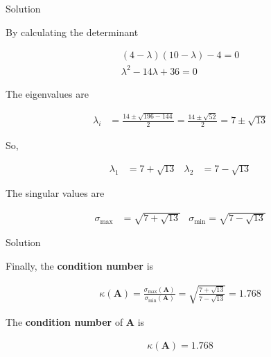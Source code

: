 \documentclass{beamer}
\numberwithin{equation}{section}
\theoremstyle{remark}
\let\vec\mathbf
\begin{document}
\begin{frame}{Solution}

By calculating the determinant 

\begin{align}
(4-\lambda)(10-\lambda)-4 = 0 \\
\lambda^2 - 14\lambda + 36 = 0
\end{align}

The eigenvalues are

\begin{align}
\lambda_i &= \frac{14 \pm \sqrt{196 - 144}}{2}
= \frac{14 \pm \sqrt{52}}{2}
= 7 \pm \sqrt{13}
\end{align}

So,

\begin{align}
\lambda_1 &= 7+\sqrt{13} & \lambda_2 &= 7-\sqrt{13}
\end{align}

The singular values are

\begin{align}
\sigma_{\max} &= \sqrt{7+\sqrt{13}} & \sigma_{\min} = \sqrt{7-\sqrt{13}}
\end{align}

\end{frame}

\begin{frame}{Solution}

  Finally, the \textbf{condition number} is

\begin{align}
\kappa(\vec{A}) = \frac{\sigma_{\max}(\vec{A})}{\sigma_{\min}(\vec{A})} = \sqrt{\frac{7+\sqrt{13}}{7-\sqrt{13}}} = 1.768
\end{align}

The \textbf{condition number} of $\vec{A}$ is 

\begin{align}
\kappa(\vec{A}) = 1.768
\end{align}

\end{frame}
\end{document}
